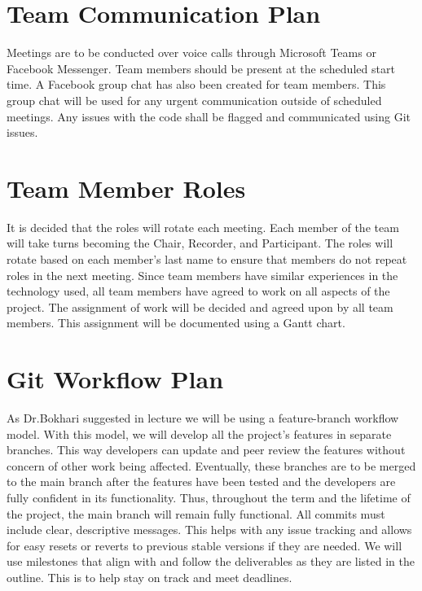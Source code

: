 \documentclass{article}
\begin{document}
	\section{Team Communication Plan}
	Meetings are to be conducted over voice calls through Microsoft Teams or 
	Facebook Messenger. Team members should be present at the scheduled start 
	time. 
	A 
	Facebook group chat has also been created for team members. This group chat 
	will be used for any urgent communication outside of scheduled meetings. 
	Any 
	issues with the code shall be flagged and communicated using Git issues.
	
	\section{Team Member Roles}
	It is decided that the roles will rotate each meeting. Each member of 
	the 
	team will take turns becoming the Chair, Recorder, and Participant. The 
	roles 
	will rotate based on each member's last name to ensure that members do not 
	repeat roles in the next meeting. Since team members have similar 
	experiences 
	in the technology used, all team members have agreed to work on 
	all 
	aspects of the project. The assignment of work will be decided and agreed 
	upon by all team members. This assignment will be documented using a Gantt 
	chart.
	
	\section{Git Workflow Plan}
	As Dr.Bokhari suggested in lecture we will be using a feature-branch 
	workflow model. With this model, we will develop all the project’s 
	features in separate branches. This way developers can update and peer
	review the features without concern of other work being affected. 
	Eventually, these branches are to be merged to the main branch after the
	features have been tested and the developers are fully confident in its 
	functionality. Thus, throughout the term and the lifetime of the project,
	the main branch will remain fully functional. All commits must include
	clear, descriptive messages. This helps with any issue tracking and allows
	for easy resets or reverts to previous stable versions if they are needed. 
	We will use milestones that align with and follow the deliverables as they 
	are listed in the outline. This is to help stay on track and meet deadlines.
	
\end{document}
